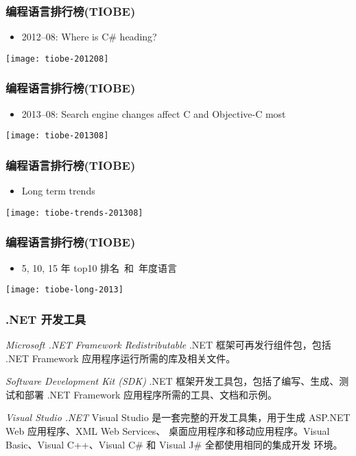 \begin{frame}
\frametitle{编程语言排行榜(TIOBE)}
\begin{itemize}
\item 2012--08: Where is C\# heading?
\end{itemize}

\centering\texttt{[image: tiobe-201208]}

\end{frame}

\begin{frame}
\frametitle{编程语言排行榜(TIOBE)}
\begin{itemize}
\item \small 2013--08: Search engine changes affect C and Objective-C most

\end{itemize}

\centering\texttt{[image: tiobe-201308]}

\end{frame}

\begin{frame}
\frametitle{编程语言排行榜(TIOBE)}
\begin{itemize}
\item Long term trends
\end{itemize}

\centering\texttt{[image: tiobe-trends-201308]}

\end{frame}

\begin{frame}
\frametitle{编程语言排行榜(TIOBE)}
\begin{itemize}
\item 5, 10, 15 年 top10 排名~和~年度语言
\end{itemize}

\centering \texttt{[image: tiobe-long-2013]}

\end{frame}

\begin{frame}
\frametitle{.NET 开发工具}

\begin{exampleblock}{\textit{Microsoft .NET Framework Redistributable}}
  \CJKindent .NET 框架可再发行组件包，包括 .NET Framework 应用程序运行所需的库及相关文件。
\end{exampleblock}
\pause
\begin{exampleblock}{\textit{Software Development Kit (SDK)}}
  \CJKindent .NET 框架开发工具包，包括了编写、生成、测试和部署 .NET Framework 应用程序所需的工具、文档和示例。
\end{exampleblock}
\pause
\begin{block}{\textit{Visual Studio .NET}}
  \CJKindent Visual Studio 是一套完整的开发工具集，用于生成 ASP.NET Web 应用程序、XML Web Services、
  桌面应用程序和移动应用程序。Visual Basic、Visual C++、Visual C\# 和 Visual J\# 全都使用相同的集成开发
  环境。
\end{block}

\end{frame}

